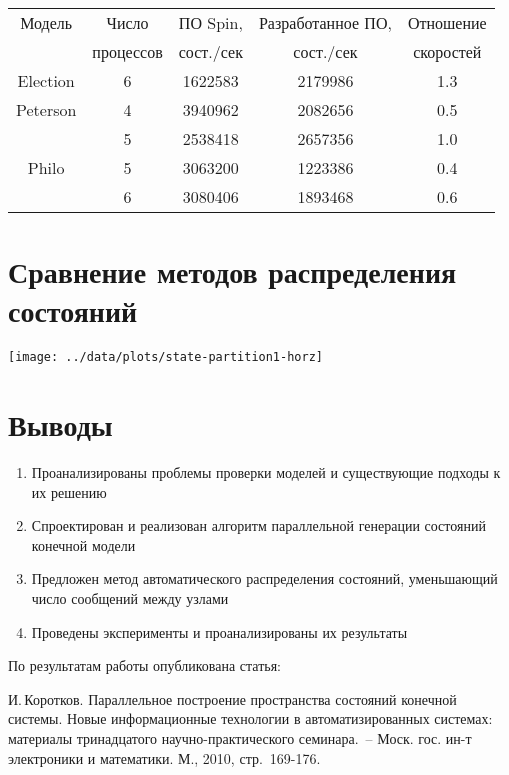 \documentclass[12pt]{article}
\begin{document}
\begin{tabular}{ccccc}
  \hline
  Модель & Число     & ПО Spin,   & Разработанное ПО, & Отношение \\
  & процессов & сост./сек &  сост./сек         & скоростей \\
  \hline
  Election & 6 & 1622583 & 2179986 & 1.3 \\
  Peterson & 4 & 3940962 & 2082656 & 0.5 \\
   & 5 & 2538418 & 2657356 & 1.0 \\
  Philo & 5 & 3063200 & 1223386 & 0.4 \\
   & 6 & 3080406 & 1893468 & 0.6 \\
  \hline
\end{tabular}

\section{Сравнение методов распределения состояний}
\label{sec:partition-cmp}

\begin{center}
  \texttt{[image: ../data/plots/state-partition1-horz]}
\end{center}

\section{Выводы}
\label{sec:conclusion}

\small
\begin{enumerate}
\item Проанализированы проблемы проверки моделей и существующие подходы к их решению
\item Спроектирован и реализован алгоритм параллельной генерации состояний конечной
  модели
\item Предложен метод автоматического распределения состояний, уменьшающий число сообщений
  между узлами
\item Проведены эксперименты и проанализированы их результаты
\end{enumerate}

По результатам работы опубликована статья:

\footnotesize
И.\,Коротков. Параллельное построение пространства состояний конечной системы. Новые
информационные технологии в автоматизированных системах: материалы тринадцатого
научно-практического семинара.~-- Моск. гос. ин-т электроники и математики. М., 2010,
стр.~169-176.
\normalsize
\end{document}
